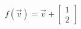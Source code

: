 \documentclass[preview]{standalone}
\begin{document}
\begin{center}
$f(\vec{v}) = \vec{v} + \begin{bmatrix} 1  \\ 2 \end{bmatrix}$
\end{center}
\end{document}
